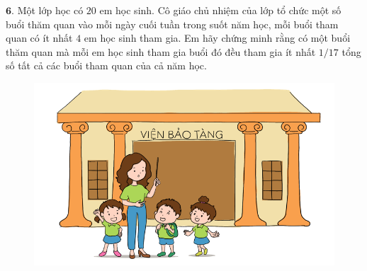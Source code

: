 \begin{multicols}{2}
\begin{figure}[H]
		\vspace*{-15pt}
	\end{figure}
	$\pmb{6.}$ Một lớp học có $20$ em học sinh. Cô giáo chủ nhiệm của lớp tổ chức một số buổi thăm quan vào mỗi ngày cuối tuần trong suốt năm học, mỗi buổi tham quan có ít nhất $4$ em học sinh tham gia. Em hãy chứng minh rằng có một buổi thăm quan mà mỗi em học sinh tham gia buổi đó đều tham gia ít nhất $1/17$ tổng số tất cả các buổi tham quan của cả năm học.
	\begin{figure}[H]
		\centering
		\vspace*{-5pt}
		\captionsetup{labelformat= empty, justification=centering}
		\includegraphics[width=1\linewidth]{Pi5_bai6}
		\vspace*{-15pt}
	\end{figure}
\end{multicols}
\newpage
\begingroup
